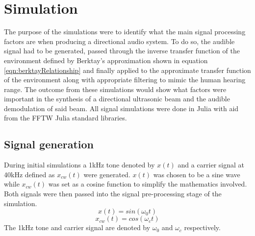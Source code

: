 \section{Simulation}
The purpose of the simulations were to identify what the main signal processing factors are when producing a directional audio system. To do so, the audible signal had to be generated, passed through the inverse transfer function of the environment defined by Berktay's approximation shown in equation \ref{eqn:berktayRelationship} and finally applied to the approximate transfer function of the environment along with appropriate filtering to mimic the human hearing range. The outcome from these simulations would show what factors were important in the synthesis of a directional ultrasonic beam and the audible demodulation of said beam. All signal simulations were done in Julia \cite{bezanson2017julia} with aid from the FFTW\cite{Padua2011} Julia standard libraries.
\subsection{Signal generation}
During initial simulations a 1kHz tone denoted by $x(t)$ and a carrier signal at 40kHz defined as $x_{cw}(t)$ were generated. $x(t)$ was chosen to be a sine wave while $x_{cw}(t)$ was set as a cosine function to simplify the mathematics involved. Both signals were then passed into the signal pre-processing stage of the simulation.
\begin{equation}
    x(t) = sin(\omega_0 t)
\end{equation}
\begin{equation}
    x_{cw}(t) = cos(\omega_c t)
\end{equation}
The 1kHz tone and carrier signal are denoted by $\omega_0$ and $\omega_c$ respectively.

